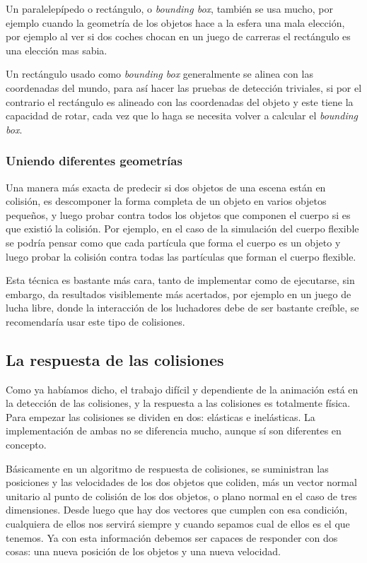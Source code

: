 Un paralelepípedo o rectángulo, o \foreignlanguage{english}{\emph{bounding box}}, también se usa mucho, por ejemplo cuando la geometría de los objetos hace a la esfera una mala elección, por ejemplo al ver si dos coches chocan en un juego de carreras el rectángulo es una elección mas sabia.

Un rectángulo usado como \foreignlanguage{english}{\emph{bounding box}} generalmente se alinea con las coordenadas del mundo, para así hacer las pruebas de detección triviales, si  por el contrario el rectángulo es alineado con las coordenadas del objeto y este tiene la capacidad de rotar, cada vez que lo haga se necesita volver a calcular el  \foreignlanguage{english}{\emph{bounding box}}.
\subsubsection{Uniendo diferentes geometrías}
Una manera más exacta de predecir si dos objetos de una escena están en colisión, es descomponer la forma completa de un objeto en varios objetos pequeños, y luego probar contra todos los objetos que componen el cuerpo si es que existió la colisión.
Por ejemplo, en el caso de la simulación del cuerpo flexible se podría pensar como que cada partícula que forma el cuerpo es un objeto y luego probar la colisión contra todas las partículas que forman el cuerpo flexible.

Esta técnica es bastante más cara, tanto de implementar como de ejecutarse, sin embargo, da resultados visiblemente más acertados, por ejemplo en un juego de lucha libre, donde la interacción de los luchadores debe de ser bastante creíble, se recomendaría usar este tipo de colisiones.

\subsection{La respuesta de las colisiones}

Como ya habíamos dicho, el trabajo difícil y dependiente de la animación está en la detección de las colisiones, y la respuesta a las colisiones es totalmente física.
Para empezar las colisiones se dividen en dos: elásticas e inelásticas.
La implementación de ambas no se diferencia mucho, aunque sí son diferentes en concepto.

Básicamente en un algoritmo de respuesta de colisiones, se suministran las posiciones y las velocidades de los dos objetos que coliden, más un vector normal unitario al punto de colisión de los dos objetos, o plano normal en el caso de tres dimensiones.
Desde luego que hay dos vectores que cumplen con esa condición, cualquiera de ellos nos servirá siempre y cuando sepamos cual de ellos es el que tenemos.
Ya con esta información debemos ser capaces de responder con dos cosas: una nueva posición de los objetos y una nueva velocidad.

